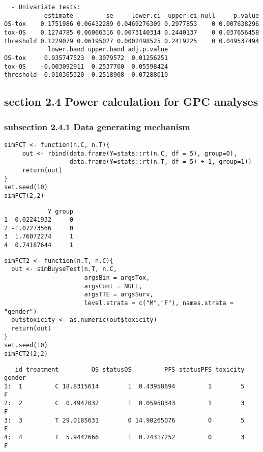 \documentclass[12pt]{article}
\begin{document}
\begin{verbatim}
  - Univariate tests:
           estimate         se     lower.ci  upper.ci null     p.value
OS-tox    0.1751986 0.06432289 0.0469276309 0.2977853    0 0.007638296
tox-OS    0.1274785 0.06066316 0.0073140314 0.2440137    0 0.037656458
threshold 0.1229079 0.06195027 0.0002498525 0.2419225    0 0.049537494
            lower.band upper.band adj.p.value
OS-tox     0.035747523  0.3079572  0.01256251
tox-OS    -0.003092911  0.2537760  0.05598424
threshold -0.010365320  0.2518908  0.07288010
\end{verbatim}

\subsection{section 2.4 Power calculation for GPC analyses}
\label{sec:org2bbb498}
\subsubsection{subsection 2.4.1 Data generating mechanism}
\label{sec:org9524567}
\lstset{language=r,label= ,caption= ,captionpos=b,numbers=none}
\begin{lstlisting}
simFCT <- function(n.C, n.T){
     out <- rbind(data.frame(Y=stats::rt(n.C, df = 5), group=0),
                  data.frame(Y=stats::rt(n.T, df = 5) + 1, group=1))
     return(out)
}
set.seed(10)
simFCT(2,2)
\end{lstlisting}

\begin{verbatim}
            Y group
1  0.02241932     0
2 -1.07273566     0
3  1.76072274     1
4  0.74187644     1
\end{verbatim}



\lstset{language=r,label= ,caption= ,captionpos=b,numbers=none}
\begin{lstlisting}
simFCT2 <- function(n.T, n.C){
  out <- simBuyseTest(n.T, n.C,
                      argsBin = argsTox,
                      argsCont = NULL,
                      argsTTE = argsSurv,
                      level.strata = c("M","F"), names.strata = "gender")
  out$toxicity <- as.numeric(out$toxicity)
  return(out)
}
set.seed(10)
simFCT2(2,2) 
\end{lstlisting}

\begin{verbatim}
   id treatment         OS statusOS         PFS statusPFS toxicity gender
1:  1         C 18.8315614        1  0.43958694         1        5      F
2:  2         C  0.4947032        1  0.05958343         1        3      F
3:  3         T 29.0185631        0 14.98265076         0        5      F
4:  4         T  5.9442666        1  0.74317252         0        3      F
\end{verbatim}
\end{document}
